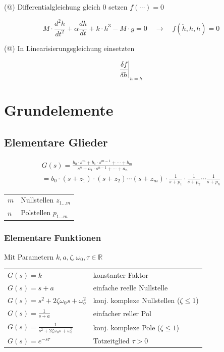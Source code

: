 \documentclass[
  10pt,
  a4paper,
  german]{article}
\makeatletter
\numberwithin{equation}{section}
\newenvironment{conditions}
  {\par\vspace{\abovedisplayskip}\noindent\begin{tabular}{>{$}l<{$} @{${}:{}$} l}}
  {\end{tabular}\par\vspace{\belowdisplayskip}}
\makeatother
\begin{document}
\begin{multicols}{2}
\begin{tcolorbox}
(@) Differentialgleichung gleich \(0\) setzen \(f(\cdots)=0\)

\[
M\cdot \frac{d^2h}{dt^2}+\alpha\frac{dh}{dt}+k\cdot h^3 - M\cdot g=0\quad \rightarrow\quad f(\ddot{h}, \dot{h}, h) = 0
\]

(@) In Linearisierungsgleichung einsetzten

\[
\left.\frac{\delta f}{\delta \ddot{h}}\right\rvert_{h=\overline{h}}
\]

\end{tcolorbox}

\hypertarget{grundelemente}{%
\section{Grundelemente}\label{grundelemente}}

\hypertarget{elementare-glieder}{%
\subsection{Elementare Glieder}\label{elementare-glieder}}

\begin{align*}
G(s)=\frac{b_0\cdot s^m+b_1\cdot s^{m-1}+\cdots+b_m}{s^n+a_1\cdot s^{n-1}+\cdots+a_n} \\
= b_0\cdot (s+z_1)\cdot(s+z_2)\cdots(s+z_m)\cdot\frac{1}{s+p_1}\cdot\frac{1}{s+p_2}\cdots\frac{1}{s+p_n}
\end{align*}

\begin{conditions}
  m & Nullstellen $z_{1\dots m}$ \\
  n & Polstellen $p_{1\dots m}$ \\
\end{conditions}

\hypertarget{elementare-funktionen}{%
\subsubsection{Elementare Funktionen}\label{elementare-funktionen}}

Mit Parametern \(k,a,\zeta,\omega_0,\tau \in \mathbb{R}\)

\begin{conditions}
  G(s)=k                                         & konstanter Faktor \\
  G(s)=s + a                                     & einfache reelle Nullstelle \\
  G(s)=s^2+2\zeta\omega_0 s+\omega_o^2           & konj. komplexe Nullstellen ($\zeta \leq 1$) \\
  G(s)=\frac{1}{s+a}                             & einfacher reller Pol \\
  G(s)=\frac{1}{s^2+2\zeta\omega_0 s+\omega_o^2} & konj. komplexe Pole ($\zeta\leq 1$) \\
  G(s)=e^{-s\tau}                                & Totzeitglied $\tau > 0$ \\
\end{conditions}


\end{multicols}
\end{document}
